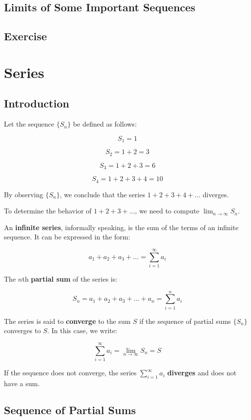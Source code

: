 \documentclass[
]{book}
\theoremstyle{definition}
\theoremstyle{definition}
\theoremstyle{definition}
\theoremstyle{definition}
\theoremstyle{remark}
\begin{document}
\section{Limits of Some Important Sequences}\label{limits-of-some-important-sequences}

\section{Exercise}\label{exercise}

\chapter{Series}\label{series}

\section{Introduction}\label{introduction-1}

Let the sequence \(\{S_n\}\) be defined as follows:

\[
S_1 = 1
\]

\[
S_2 = 1 + 2 = 3
\]

\[
S_3 = 1 + 2 + 3 = 6
\]

\[
S_4 = 1 + 2 + 3 + 4 = 10
\]

By observing \(\{S_n\}\), we conclude that the series \(1 + 2 + 3 + 4 + \dots\) diverges.

To determine the behavior of \(1 + 2 + 3 + \dots\), we need to compute \(\lim_{n \to \infty} S_n\).

An \textbf{infinite series}, informally speaking, is the sum of the terms of an infinite sequence. It can be expressed in the form:

\[
a_1 + a_2 + a_3 + \dots = \sum_{i=1}^{\infty} a_i
\]

The \(n\)th \textbf{partial sum} of the series is:

\[
S_n = a_1 + a_2 + a_3 + \dots + a_n = \sum_{i=1}^{n} a_i
\]

The series is said to \textbf{converge} to the sum \(S\) if the sequence of partial sums \(\{S_n\}\) converges to \(S\). In this case, we write:

\[
\sum_{i=1}^{\infty} a_i = \lim_{n \to \infty} S_n = S
\]

If the sequence does not converge, the series \(\sum_{i=1}^{\infty} a_i\) \textbf{diverges} and does not have a sum.

\section{Sequence of Partial Sums}\label{sequence-of-partial-sums}
\end{document}
